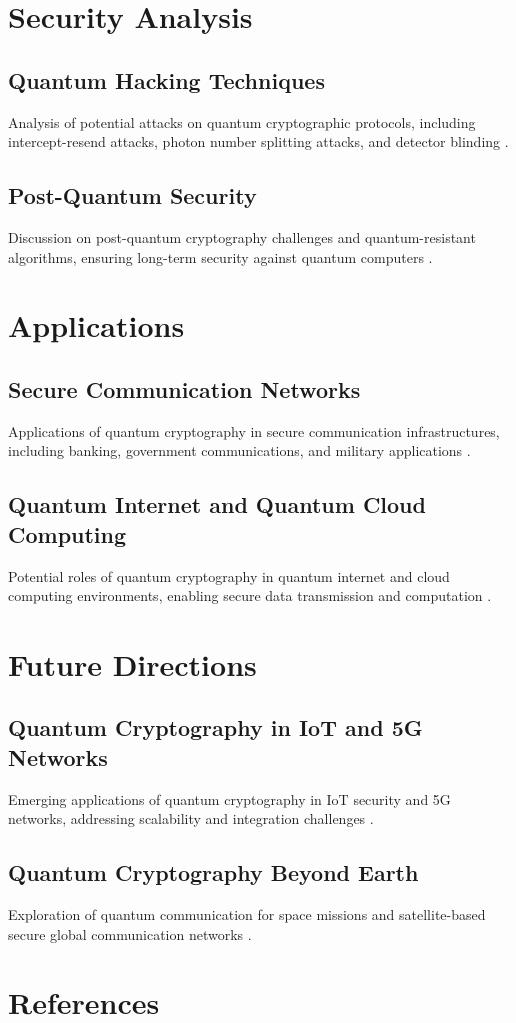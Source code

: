 \documentclass[12pt]{article}
\begin{document}
\section{Security Analysis}
\subsection{Quantum Hacking Techniques}
Analysis of potential attacks on quantum cryptographic protocols, including intercept-resend attacks, photon number splitting attacks, and detector blinding \citep{gisin2002quantum, scarani2009security}.

\subsection{Post-Quantum Security}
Discussion on post-quantum cryptography challenges and quantum-resistant algorithms, ensuring long-term security against quantum computers \citep{bernstein2009post, luo2019towards}.

\section{Applications}
\subsection{Secure Communication Networks}
Applications of quantum cryptography in secure communication infrastructures, including banking, government communications, and military applications \citep{chiussi2006quantum, kiktenko2017quantum}.

\subsection{Quantum Internet and Quantum Cloud Computing}
Potential roles of quantum cryptography in quantum internet and cloud computing environments, enabling secure data transmission and computation \citep{kimble2008quantum, zhang2020quantum}.

\section{Future Directions}
\subsection{Quantum Cryptography in IoT and 5G Networks}
Emerging applications of quantum cryptography in IoT security and 5G networks, addressing scalability and integration challenges \citep{sharma2020quantum, huang2021towards}.

\subsection{Quantum Cryptography Beyond Earth}
Exploration of quantum communication for space missions and satellite-based secure global communication networks \citep{bacco2020quantum, pirandola2017advances}.

\section*{References}


\end{document}
